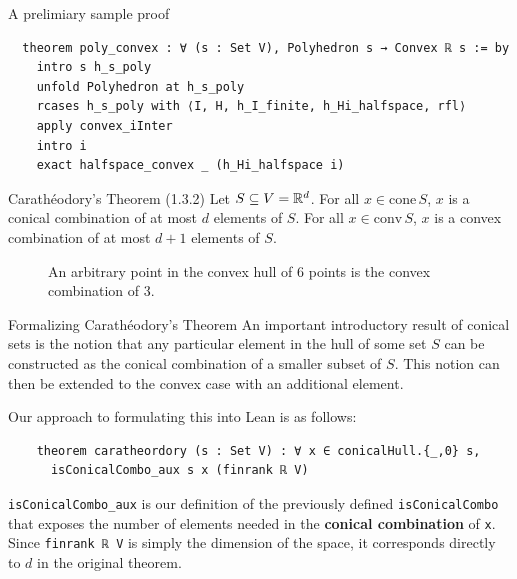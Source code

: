 \documentclass[final]{beamer}
\newlength{\colwidth}
\begin{document}
\begin{frame}[fragile]
\begin{columns}[t]
        \begin{column}{\colwidth}
            \begin{block}{A prelimiary sample proof}
            \vspace{-0.5em}
\begin{Verbatim}
  theorem poly_convex : ∀ (s : Set V), Polyhedron s → Convex ℝ s := by
    intro s h_s_poly
    unfold Polyhedron at h_s_poly
    rcases h_s_poly with ⟨I, H, h_I_finite, h_Hi_halfspace, rfl⟩
    apply convex_iInter
    intro i
    exact halfspace_convex _ (h_Hi_halfspace i)
\end{Verbatim}
            \end{block}


            \begin{alertblock}{Carath\'eodory's Theorem (1.3.2)}
              Let $S \subseteq V = \mathbb{R}^d$. For all $x \in \text{cone}\,S$, $x$ is a conical combination of at most $d$ elements of $S$. For all $x \in \text{conv}\,S$, $x$ is a convex combination of at most $d + 1$ elements of $S$. 
            \end{alertblock}

            \begin{figure}[htbp]
                    \centering
                    
                    \caption{An arbitrary point in the convex hull of 6 points is the convex combination of 3.\label{fig:caratheodory}}
            \end{figure}

            \begin{block}{Formalizing Carath\'eodory's Theorem}
              An important introductory result of conical sets is the notion that any particular element in the hull of some set $S$ can be constructed as the conical combination of a smaller subset of $S$. This notion can then be extended to the convex case with an additional element.

              Our approach to formulating this into Lean is as follows:
\begin{Verbatim}
    theorem caratheordory (s : Set V) : ∀ x ∈ conicalHull.{_,0} s, 
      isConicalCombo_aux s x (finrank ℝ V) 
\end{Verbatim}
              \verb|isConicalCombo_aux| is our definition of the previously defined \verb|isConicalCombo| that exposes the number of elements needed in the \textbf{conical combination} of \verb|x|. Since \verb|finrank ℝ V| is simply the dimension of the space, it corresponds directly to $d$ in the original theorem.


\end{block}
\end{column}
\end{columns}
\end{frame}
\end{document}
